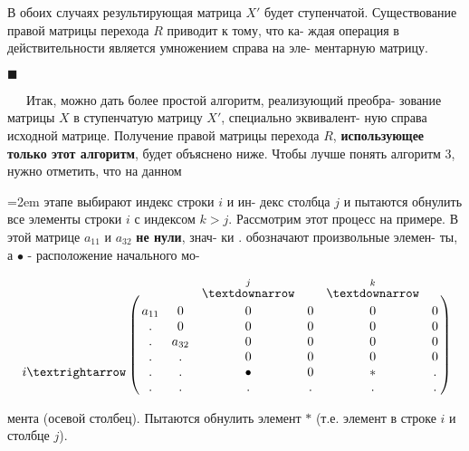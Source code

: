 \documentclass{mai_book}
\begin{document}
	В обоих случаях результирующая матрица $X'$ будет ступенчатой.\linebreak
	Существование правой матрицы перехода $R$ приводит к тому, что ка-\linebreak
	ждая операция в действительности является умножением справа на эле-\linebreak
	ментарную матрицу.
	\begin{flushright}$\blacksquare$\end{flushright}
	{\ \ \ }Итак, можно дать более простой алгоритм, реализующий преобра-\linebreak
	зование матрицы $X$ в ступенчатую матрицу $X'$, специально эквивалент-\linebreak
	ную справа исходной матрице. Получение правой матрицы перехода $R$,\linebreak
	{\bf использующее только этот алгоритм}, будет объяснено ниже.\linebreak
	Чтобы лучше понять алгоритм 3, нужно отметить, что на данном\linebreak
	{\small
	\begin{minipage}[t]{80mm}\parindent=2em
		\noindent
		этапе выбирают индекс строки $i$ и ин-\linebreak
		декс столбца $j$ и пытаются обнулить все\linebreak
		элементы строки $i$ с индексом $k > j$.\linebreak
		Рассмотрим этот процесс на примере.\linebreak
		В этой матрице $a_{11}$ и $a_{32}$ {\bf не нули}, знач-\linebreak
		ки . обозначают произвольные элемен-\linebreak
		ты, а $\bullet$ - расположение начального мо-
	\end{minipage}
	\hfill
	\begin{minipage}[t]{50mm}
	\[ \bordermatrix{
		& & & \stackrel{j}{\textdownarrow} & & \stackrel{k}{\textdownarrow} & \cr
		& a_{11} & 0 & 0 & 0 & 0 & 0 \cr
		& . & 0 & 0 & 0 & 0 & 0 \cr
		& . & a_{32} & 0 & 0 & 0 & 0 \cr
		& . & . & 0 & 0 & 0 & 0 \cr
		i\textrightarrow  & . & . & \bullet & 0 & \ast & . \cr
	    & . & . & . & . & . & . \cr}
	\]
	\end{minipage}}

	\pagebreak
	
	
	\noindent
	мента (осевой столбец). Пытаются обнулить элемент $\ast$ (т.е. элемент в\linebreak
	строке $i$ и столбце $j$).
	
\end{document}
